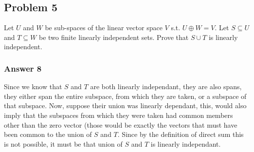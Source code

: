 \documentclass[11pt]{article}
\begin{document}
\subsection{Problem 5}
\label{sec-1-5}
Let $U$ and $W$ be sub-spaces of the linear vector space $V$ s.t. $U \oplus W = V$.
Let $S \subseteq U$ and $T \subseteq W$ be two finite linearly independent sets.
Prove that $S \cup T$ is linearly independent.

\subsubsection{Answer 8}
\label{sec-1-5-1}
Since we know that $S$ and $T$ are both linearly independant, they are also spans,
they either span the entire subspace, from which they are taken, or a subspace of
that subspace.  Now, suppose their union was linearly dependant, this, would also
imply that the subspaces from which they were taken had common members other than
the zero vector (those would be exactly the vectors that must have been common
to the union of $S$ and $T$.  Since by the definition of direct sum this is not
possible, it must be that union of $S$ and $T$ is linearly independant.
\end{document}
